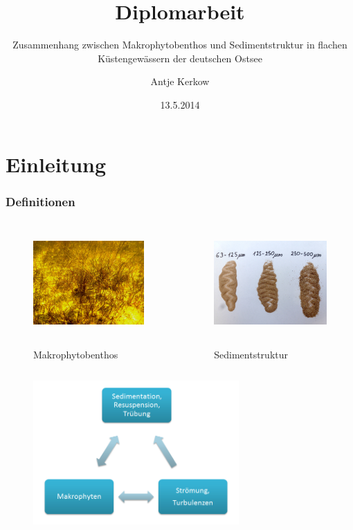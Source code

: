 \documentclass[xcolor=dvipsnames]{beamer}
\title{Diplomarbeit}
\subtitle{Zusammenhang zwischen Makrophytobenthos und Sedimentstruktur in flachen Küstengewässern der deutschen Ostsee}
\author{Antje Kerkow}
\institute[Universität Greifswald]{Studiengang Landschaftsökologie und Naturschutz}
\date{13.5.2014}
\begin{document}
\begin{frame}
\titlepage
\end{frame}

\section{Einleitung}
\begin{frame}
\frametitle{Definitionen}
\begin{columns}
\begin{column}{5.5cm}
\begin{figure}
\includegraphics[height=40mm]{images/Fotos/makrophytobenthos.jpg}

Makrophytobenthos
\end{figure}
\end{column}
\begin{column}{5.5cm}
\begin{figure}
\includegraphics[height=40mm]{images/Fotos/korngroessen.jpg}

Sedimentstruktur
\end{figure}
\end{column}
\end{columns}
\end{frame}

\begin{frame}
\begin{figure}
\includegraphics[width=0.7\textwidth]{images/Schema_Pfl_Sedim_Strm}
\end{figure}
\end{frame}
\end{document}
